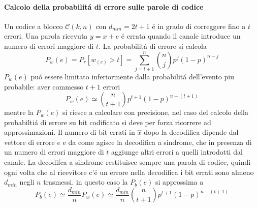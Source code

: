             \paragraph{Calcolo della probabilitá di errore sulle parole di codice}
                Un codice a blocco $\mathcal{C}(k,n)$ con $d_{min}=2t+1$ é in grado di correggere fino a $t$ errori.
                Una parola ricevuta $y=x+e$ é errata quando il canale introduce un numero di errori maggiore di $t$.
                La probabilitá di errore si calcola
                \[
                    P_w(e)= P_r[w_{(e)}>t] = \sum_{j=t+1}^{n}\binom{n}{j}p^j(1-p)^{n-j}
                \]
                $P_w(e)$ puó essere limitato inferiormente dalla probabilitá dell'evento piu probabile: aver commesso $t+1$
                errori
                \[
                    P_w(e) \simeq \binom{n}{t+1}p^{t+1}(1-p)^{n-(t+1)}
                \]
                mentre la $P_w(e)$ si riesce a calcolare con precisione, nel caso del calcolo della probabiltiá di errore 
                su bit codificato si deve per forza ricorrere ad approssimazioni. Il numero di bit errati in $\hat{x}$ dopo la 
                decodifica dipende dal vettore di errore $e$ e da come agisce la decodifica a sindrome, che in presenza di un numero 
                di errori maggiore di $t$ aggiunge altri errori a quelli introdotti dal canale. La decodifca a sindrome restituisce
                sempre una parola di codice, quindi ogni volta che al ricevitore c'é un errore nella decodifica i bit errati sono almeno
                $d_{min}$ negli $n$ trasmessi. in questo caso la $P_b(e)$ si approssima a
                \[
                    P_b(e) \simeq\frac{d_{min}}{n}P_w(e)\simeq\frac{d_{min}}{n}\binom{n}{t+1}p^{t+1}(1-p)^{n-(t+1)}  
                \] 
